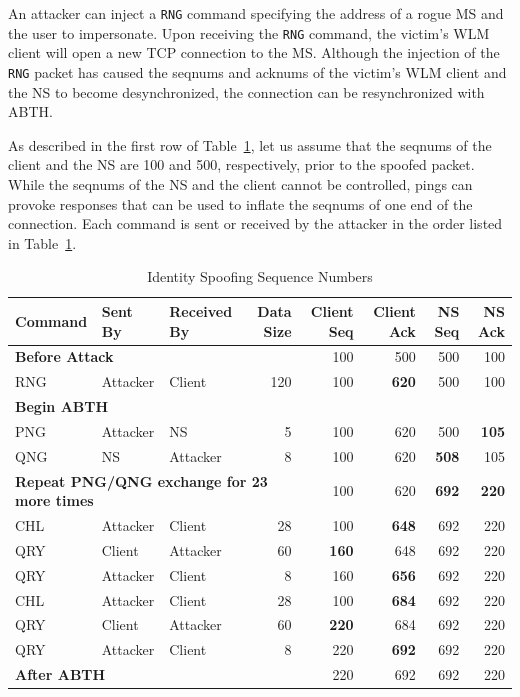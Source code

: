 \documentclass{sig-alternate}
\begin{document}
An attacker can inject a \texttt{RNG} command specifying the address of a rogue MS and the user to impersonate.
Upon receiving the \texttt{RNG} command, the victim's WLM client will open a new TCP connection to the MS.
Although the injection of the \texttt{RNG} packet has caused the seqnums and acknums of the victim's WLM client and the NS to become desynchronized, the connection can be resynchronized with ABTH.

As described in the first row of Table~\ref{tab:identityspoof}, let us assume that the seqnums of the client and the NS are 100 and 500, respectively, prior to the spoofed packet.
While the seqnums of the NS and the client cannot be controlled, pings can provoke responses that can be used to inflate the seqnums of one end of the connection.
Each command is sent or received by the attacker in the order listed in Table~\ref{tab:identityspoof}.

\begin{table}[tbp]
	\centering

	\caption{Identity Spoofing Sequence Numbers}
	\label{tab:identityspoof}

	\begin{tabular}{l l l r r r r r}
		\hline
		\hline
		\textbf{Command} & \textbf{Sent By} & \textbf{Received By} & \textbf{Data Size} & \textbf{Client Seq} & \textbf{Client Ack} & \textbf{NS Seq} & \textbf{NS Ack} \\
		\hline
		\multicolumn{4}{l}{\textbf{Before Attack}} & 100 & 500 & 500 & 100 \\
		RNG & Attacker & Client & 120 & 100 & \textbf{620} & 500 & 100 \\
		\multicolumn{8}{l}{\textbf{Begin ABTH}} \\
		PNG & Attacker & NS & 5 & 100 & 620 & 500 & \textbf{105} \\
		QNG & NS & Attacker & 8 & 100 & 620 & \textbf{508} & 105 \\
		\multicolumn{4}{l}{\textbf{Repeat PNG/QNG exchange for 23 more times}} & 100 & 620 & \textbf{692} & \textbf{220} \\
		CHL & Attacker & Client & 28 & 100 & \textbf{648} & 692 & 220 \\
		QRY & Client & Attacker & 60 & \textbf{160} & 648 & 692 & 220 \\
		QRY & Attacker & Client & 8 & 160 & \textbf{656} & 692 & 220 \\
		CHL & Attacker & Client & 28 & 100 & \textbf{684} & 692 & 220 \\
		QRY & Client & Attacker & 60 & \textbf{220} & 684 & 692 & 220 \\
		QRY & Attacker & Client & 8 & 220 & \textbf{692} & 692 & 220 \\
		\hline
		\hline
		\multicolumn{4}{l}{\textbf{After ABTH}} & 220 & 692 & 692 & 220 \\
	\end{tabular}
\end{table}
\end{document}
